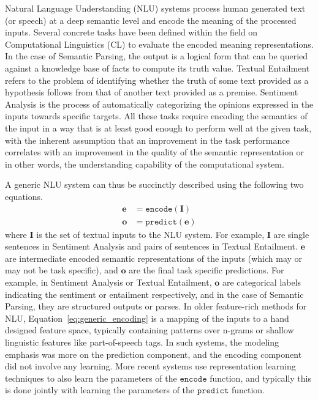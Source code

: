 Natural Language Understanding (NLU) systems process human generated text (or speech) at a deep semantic level and encode the meaning
of the processed inputs. Several concrete tasks have been defined within the field on Computational Linguistics (CL) to evaluate the encoded meaning representations.
In the case of Semantic Parsing, the output is a logical form that can be queried against a knowledge base of facts to compute its truth value. Textual Entailment refers to the 
problem of identifying whether the truth of some text provided as a hypothesis follows from that of another text provided as a premise. Sentiment Analysis is the process of 
automatically categorizing the opinions expressed in the inputs towards specific targets. All these tasks require encoding the semantics of the input in a way that is
at least good enough to perform well at the given task, with the inherent assumption that an improvement in the task performance correlates with an improvement in the
quality of the semantic representation or in other words, the understanding capability of the computational system.

A generic NLU system can thus be succinctly described using the following two equations.
\begin{align}
 \mathbf{e} &= \mathtt{encode}(\mathbf{I}) \label{eq:generic_encoding}\\
 \mathbf{o} &= \mathtt{predict}(\mathbf{e}) \label{eq:generic_prediction}
\end{align}
where $\mathbf{I}$ is the set of textual inputs to the NLU system. For example, $\mathbf{I}$  are single sentences in Sentiment Analysis and pairs of sentences in Textual Entailment. $\textbf{e}$ are intermediate 
encoded semantic representations of the inputs (which may or may not be task specific), and $\mathbf{o}$ are the final task specific predictions. For example, in Sentiment Analysis or Textual Entailment, 
$\mathbf{o}$ are categorical labels indicating the sentiment or entailment respectively, and in the case of Semantic Parsing, they are structured outputs or parses. In older feature-rich methods for NLU, 
Equation~\ref{eq:generic_encoding} is a mapping of the inputs to a hand designed feature space, typically containing patterns over n-grams or shallow linguistic features like part-of-speech tags. In such systems,
the modeling emphasis was more on the prediction component, and the encoding component did not involve any learning. More recent systems use representation learning techniques to also learn the parameters of the
$\mathtt{encode}$ function, and typically this is done jointly with learning the parameters of the $\mathtt{predict}$ function.

